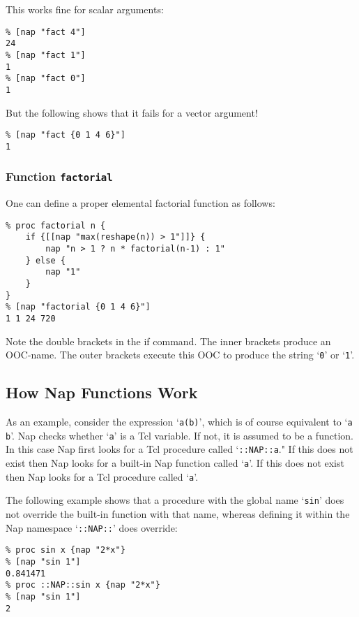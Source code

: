 This works fine for scalar arguments:
  \begin{verbatim}
% [nap "fact 4"]
24
% [nap "fact 1"]
1
% [nap "fact 0"]
1
\end{verbatim}

But the following shows that it fails for a vector argument!
  \begin{verbatim}
% [nap "fact {0 1 4 6}"]
1
\end{verbatim}

\subsubsection{Function \texttt{factorial}}
    \label{writing-procs-factorial}

One can define a proper elemental factorial function as
  follows:
  \begin{verbatim}
% proc factorial n {
    if {[[nap "max(reshape(n)) > 1"]]} {
        nap "n > 1 ? n * factorial(n-1) : 1"
    } else {
        nap "1"
    }
}
% [nap "factorial {0 1 4 6}"]
1 1 24 720
\end{verbatim}

Note the double brackets in the if command. The inner brackets
produce an OOC-name. The outer brackets execute this OOC to produce the
string `\texttt{0}' or `\texttt{1}'.

\subsection{How Nap Functions Work}
    \label{writing-procs-How}

As an example, consider the expression `\texttt{a(b)}', which is of course equivalent to `\texttt{a b}'. Nap checks whether `\texttt{a}' is a Tcl variable. If not, it is assumed to be a
  function. In this case Nap first looks for a Tcl procedure called
  `\texttt{::NAP::a}." If this does not exist then Nap looks
  for a built-in Nap function called `\texttt{a}'. If this does not exist then Nap looks for a Tcl
  procedure called `\texttt{a}'.
  

The following example shows that a procedure with the global name
  `\texttt{sin}' does not override the built-in function with
  that name, whereas defining it within the Nap namespace `\texttt{::NAP::}' does override:
  \begin{verbatim}
% proc sin x {nap "2*x"}
% [nap "sin 1"]
0.841471
% proc ::NAP::sin x {nap "2*x"}
% [nap "sin 1"]
2
\end{verbatim}

